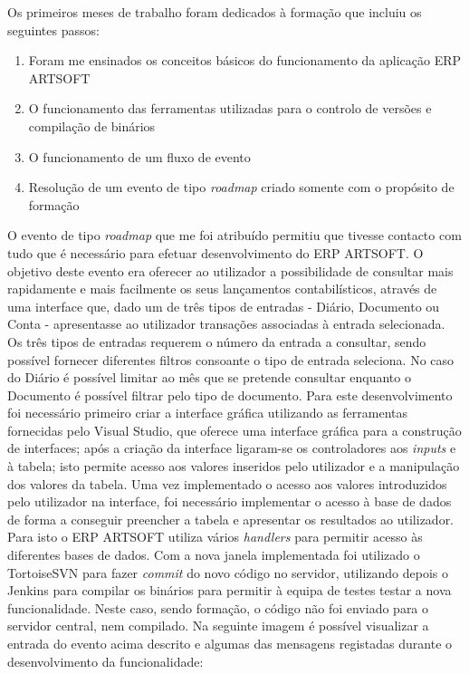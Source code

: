 \documentclass[sigplan]{acmart}
\begin{document}
Os primeiros meses de trabalho foram dedicados à formação que incluiu os seguintes passos:
\begin{enumerate}
  \item Foram me ensinados os conceitos básicos do funcionamento da aplicação ERP ARTSOFT
  \item O funcionamento das ferramentas utilizadas para o controlo de versões e compilação de binários
  \item O funcionamento de um fluxo de evento
  \item Resolução de um evento de tipo \textit{roadmap} criado somente com o propósito de formação
\end{enumerate}
O evento de tipo \textit{roadmap} que me foi atribuído permitiu que tivesse contacto com tudo que é necessário para efetuar desenvolvimento do ERP ARTSOFT. O objetivo deste evento era oferecer ao utilizador a possibilidade de consultar mais rapidamente e mais facilmente os seus lançamentos contabilísticos, através de uma interface que, dado um de três tipos de entradas - Diário, Documento ou Conta - apresentasse ao utilizador transações associadas à entrada selecionada. Os três tipos de entradas requerem o número da entrada a consultar, sendo possível fornecer diferentes filtros consoante o tipo de entrada seleciona. No caso do Diário é possível limitar ao mês que se pretende consultar enquanto o Documento é possível filtrar pelo tipo de documento. Para este desenvolvimento foi necessário primeiro criar a interface gráfica utilizando as ferramentas fornecidas pelo Visual Studio, que oferece uma interface gráfica para a construção de interfaces; após a criação da interface ligaram-se os controladores aos \textit{inputs} e à tabela; isto permite acesso aos valores inseridos pelo utilizador e a manipulação dos valores da tabela. Uma vez implementado o acesso aos valores introduzidos pelo utilizador na interface, foi necessário implementar o acesso à base de dados de forma a conseguir preencher a tabela e apresentar os resultados ao utilizador. Para isto o ERP ARTSOFT utiliza vários \textit{handlers} para permitir acesso às diferentes bases de dados. Com a nova janela implementada foi utilizado o TortoiseSVN para fazer \textit{commit} do novo código no servidor, utilizando depois o Jenkins para compilar os binários para permitir à equipa de testes testar a nova funcionalidade. Neste caso, sendo formação, o código não foi enviado para o servidor central, nem compilado. Na seguinte imagem é possível visualizar a entrada do evento acima descrito e algumas das mensagens registadas durante o desenvolvimento da funcionalidade:
\end{document}
